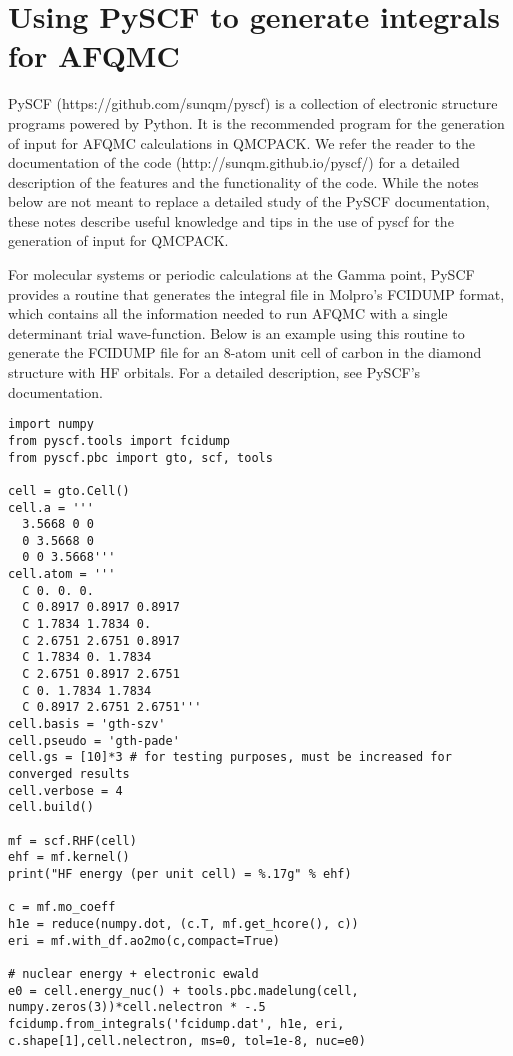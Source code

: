 \section{Using PySCF to generate integrals for AFQMC}
\label{sec:pyscf}

PySCF (https://github.com/sunqm/pyscf) is a collection of electronic structure programs powered by Python. It is the recommended program for the generation of input for AFQMC calculations in QMCPACK. We refer the reader to the documentation of the code (http://sunqm.github.io/pyscf/) for a detailed description of the features and the functionality of the code. While the notes below are not meant to replace a detailed study of the PySCF documentation, these notes describe useful knowledge and tips in the use of pyscf for the generation of input for QMCPACK. 

For molecular systems or periodic calculations at the Gamma point, PySCF provides a routine that generates the integral file in Molpro's FCIDUMP format, which contains all the information needed to run AFQMC with a single determinant trial wave-function. Below is an example using this routine to generate the FCIDUMP file for an 8-atom unit cell of carbon in the diamond structure with HF orbitals. For a detailed description, see PySCF's documentation.  
\begin{lstlisting}[caption=Simple example showing how to generate FCIDUMP files with PySCF]
import numpy
from pyscf.tools import fcidump
from pyscf.pbc import gto, scf, tools

cell = gto.Cell()
cell.a = '''
  3.5668 0 0
  0 3.5668 0
  0 0 3.5668'''
cell.atom = '''
  C 0. 0. 0. 
  C 0.8917 0.8917 0.8917
  C 1.7834 1.7834 0. 
  C 2.6751 2.6751 0.8917
  C 1.7834 0. 1.7834
  C 2.6751 0.8917 2.6751
  C 0. 1.7834 1.7834
  C 0.8917 2.6751 2.6751'''
cell.basis = 'gth-szv'
cell.pseudo = 'gth-pade'
cell.gs = [10]*3 # for testing purposes, must be increased for converged results 
cell.verbose = 4
cell.build()

mf = scf.RHF(cell)
ehf = mf.kernel()
print("HF energy (per unit cell) = %.17g" % ehf) 

c = mf.mo_coeff
h1e = reduce(numpy.dot, (c.T, mf.get_hcore(), c))
eri = mf.with_df.ao2mo(c,compact=True)

# nuclear energy + electronic ewald 
e0 = cell.energy_nuc() + tools.pbc.madelung(cell, numpy.zeros(3))*cell.nelectron * -.5
fcidump.from_integrals('fcidump.dat', h1e, eri, c.shape[1],cell.nelectron, ms=0, tol=1e-8, nuc=e0)
\end{lstlisting}


